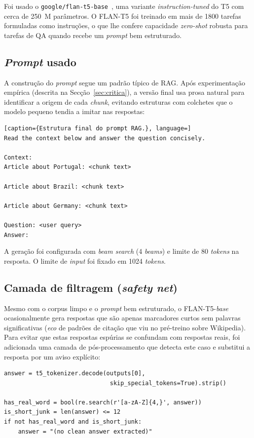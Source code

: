 \documentclass[11pt,a4paper]{article}
\begin{document}
Foi usado o \texttt{google/flan-t5-base}~\cite{flant5}, uma variante \emph{instruction-tuned} do T5 com cerca de 250~M parâmetros. O FLAN-T5 foi treinado em mais de 1800 tarefas formuladas como instruções, o que lhe confere capacidade \emph{zero-shot} robusta para tarefas de QA quando recebe um \emph{prompt} bem estruturado.

\subsection{\emph{Prompt} usado}

A construção do \emph{prompt} segue um padrão típico de RAG. Após experimentação empírica (descrita na Secção~\ref{sec:critica}), a versão final usa prosa natural para identificar a origem de cada \emph{chunk}, evitando estruturas com colchetes que o modelo pequeno tendia a imitar nas respostas:

\begin{lstlisting}[caption={Estrutura final do prompt RAG.}, language=]
Read the context below and answer the question concisely.

Context:
Article about Portugal: <chunk text>

Article about Brazil: <chunk text>

Article about Germany: <chunk text>

Question: <user query>
Answer:
\end{lstlisting}

A geração foi configurada com \emph{beam search} (4 \emph{beams}) e limite de 80 \emph{tokens} na resposta. O limite de \emph{input} foi fixado em 1024 \emph{tokens}.

\subsection{Camada de filtragem (\emph{safety net})}

Mesmo com o corpus limpo e o \emph{prompt} bem estruturado, o FLAN-T5-\emph{base} ocasionalmente gera respostas que são apenas marcadores curtos sem palavras significativas (\emph{eco} de padrões de citação que viu no pré-treino sobre Wikipedia). Para evitar que estas respostas espúrias se confundam com respostas reais, foi adicionada uma camada de pós-processamento que detecta este caso e substitui a resposta por um aviso explícito:

\begin{lstlisting}[caption={Camada de filtragem aplicada à resposta gerada.}]
answer = t5_tokenizer.decode(outputs[0],
                              skip_special_tokens=True).strip()

has_real_word = bool(re.search(r'[a-zA-Z]{4,}', answer))
is_short_junk = len(answer) <= 12
if not has_real_word and is_short_junk:
    answer = "(no clean answer extracted)"
\end{lstlisting}
\end{document}
